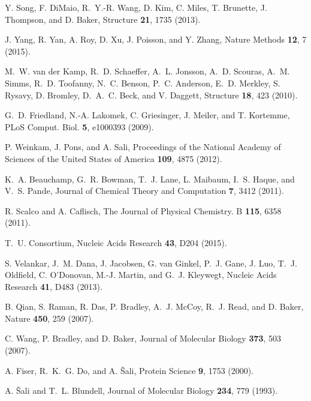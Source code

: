 \documentclass[aps,prl,preprint,nofootinbib,superscriptaddress,linenumbers]{revtex4-1}
\begin{document}
\begin{thebibliography}{100}
Y. Song, F. {DiMaio}, R.~Y.-R. Wang, D. Kim, C. Miles, T. Brunette, J.
  Thompson, and D. Baker, Structure {\bf 21},  1735  (2013).

J. Yang, R. Yan, A. Roy, D. Xu, J. Poisson, and Y. Zhang, Nature Methods {\bf
  12},  7  (2015).

M.~W. {van der Kamp}, R.~D. Schaeffer, A.~L. Jonsson, A.~D. Scouras, A.~M.
  Simms, R.~D. Toofanny, N.~C. Benson, P.~C. Anderson, E.~D. Merkley, S.
  Rysavy, D. Bromley, D.~A.~C. Beck, and V. Daggett, Structure {\bf 18},  423
  (2010).

G.~D. Friedland, N.-A. Lakomek, C. Griesinger, J. Meiler, and T. Kortemme, PLoS
  Comput. Biol. {\bf 5},  e1000393  (2009).

P. Weinkam, J. Pons, and A. Sali, Proceedings of the National Academy of
  Sciences of the United States of America {\bf 109},  4875  (2012).

K.~A. Beauchamp, G.~R. Bowman, T.~J. Lane, L. Maibaum, I.~S. Haque, and V.~S.
  Pande, Journal of Chemical Theory and Computation {\bf 7},  3412  (2011).

R. Scalco and A. Caflisch, The Journal of Physical Chemistry. B {\bf 115},
  6358  (2011).

T.~U. Consortium, Nucleic Acids Research {\bf 43},  D204  (2015).

S. Velankar, J.~M. Dana, J. Jacobsen, G. van Ginkel, P.~J. Gane, J. Luo, T.~J.
  Oldfield, C. O'Donovan, M.-J. Martin, and G.~J. Kleywegt, Nucleic Acids
  Research {\bf 41},  D483  (2013).

B. Qian, S. Raman, R. Das, P. Bradley, A.~J. McCoy, R.~J. Read, and D. Baker,
  Nature {\bf 450},  259  (2007).

C. Wang, P. Bradley, and D. Baker, Journal of Molecular Biology {\bf 373},  503
   (2007).

A. Fiser, R.~K.~G. Do, and A. {\v{S}ali}, Protein Science {\bf 9},  1753
  (2000).

A. {\v{S}ali} and T.~L. Blundell, Journal of Molecular Biology {\bf 234},  779
  (1993).


\end{thebibliography}
\end{document}
